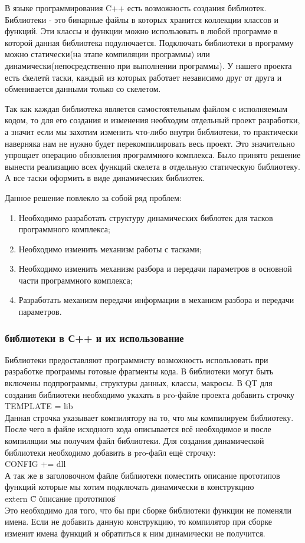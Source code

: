 В языке программирования C++ есть возможность создания библиотек. Библиотеки - это бинарные файлы в которых хранится коллекции классов и функций. Эти классы и функции можно использовать в любой программе в которой данная библиотека подулючается. Подключать библиотеки в программу можно статически(на этапе компиляции программы) или динамически(непосредственно при выполнении программы). У нашего проекта есть \"скелет\" и таски, каждый из которых работает независимо друг от друга и обменивается данными только со скелетом. 

Так как каждая библиотека является самостоятельным файлом с исполняемым кодом, то для его создания и изменения необходим отдельный проект разработки, а значит если мы захотим изменить что-либо внутри библиотеки, то практически наверняка нам не нужно будет перекомпилировать весь проект. Это значительно упрощает операцию обновления программного комплекса. Было принято решение вынести реализацию всех функций скелета в отдельную статическую библиотеку. А все таски оформить в виде динамических библиотек. 

Данное решение повлекло за собой ряд проблем:
\begin{enumerate}
\item Необходимо разработать структуру динамических библотек для тасков программного комплекса;
\item Необходимо изменить механизм работы с тасками;
\item Необходимо изменить механизм разбора и передачи параметров в основной части программного комплекса;
\item Разработать механизм передачи информации в механизм разбора и передачи параметров.
\end{enumerate}

\subsubsection{библиотеки в С++ и их использование}

Библиотеки предоставляют программисту возможность использовать при разработке программы готовые фрагменты кода. В библиотеки могут быть включены подпрограммы, структуры данных, классы, макросы. В QT для создания библиотеки необходимо укахать в pro-файле проекта добавить строчку \\
TEMPLATE = lib\\
Данная строчка указывает компилятору на то, что мы компилируем библиотеку. После чего в файле исходного кода описывается всё необходимое и после компиляции мы получим файл библиотеки. Для создания динамической библиотеки необходимо добавить в pro-файл ещё строчку: \\
CONFIG += dll\\
А так же в заголовочном файле библиотеки поместить описание прототипов функций которые мы хотим подключать динамически в конструкцию\\
extern \"C\"{ \"описание прототипов\" }\\
Это необходимо для того, что бы при сборке библиотеки функции не поменяли имена. Если не добавить данную конструкцию, то компилятор при сборке изменит имена функций и обратиться к ним динамически не получится.

